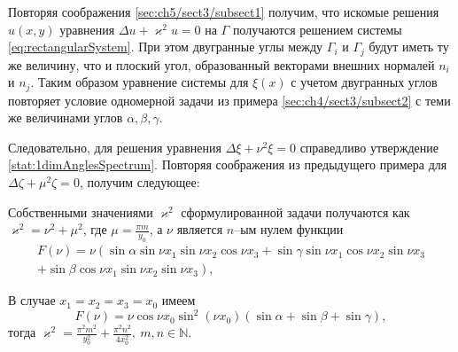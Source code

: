 Повторяя соображения \eqref{sec:ch5/sect3/subsect1} получим, что искомые решения $u(x,y)$ уравнения $\Delta u + \varkappa^2 u=0$ на $\Gamma$ получаются решением системы \eqref{eq:rectangularSystem}. При этом двугранные углы между $\Gamma_i$ и $\Gamma_j$ будут иметь ту же величину, что и плоский угол, образованный векторами внешних нормалей $n_i$ и $n_j$. Таким образом 
 уравнение системы для $\xi(x)$ с учетом двугранных углов повторяет условие одномерной задачи из примера \eqref{sec:ch4/sect3/subsect2} с теми же величинами углов $\alpha, \beta, \gamma$. 
 
Следовательно, для решения уравнения $\Delta \xi + \nu^2 \xi = 0$ справедливо утверждение \ref{stat:1dimAnglesSpectrum}.
Повторяя соображения из предыдущего примера для $\Delta \zeta + \mu^2 \zeta = 0$, получим следующее:
\begin{statement}
Собственными значениями $\varkappa^2$ сформулированной задачи получаются как
$\varkappa^2 = \nu^2 + \mu^2$, где $\mu =  \frac{\pi m}{y_0}$, а $\nu$ является $n$--ым нулем функции
\begin{multline*}
F(\nu)=\nu \left(
\sin{\alpha} \sin{\nu x_1} \sin{\nu x_2} \cos{\nu x_3} + 
\sin{\gamma} \sin{\nu x_1} \cos{\nu x_2} \sin{\nu x_3} 
\right. \\ \left. + 
\sin{\beta} \cos{\nu x_1} \sin{\nu x_2} \sin{\nu x_3} 
 \right),
 \end{multline*}
\end{statement}

В случае $x_1=x_2=x_3=x_0$ имеем $$F(\nu) = \nu \cos \nu x_0 \sin^2(\nu x_0) \left(\sin \alpha + \sin \beta + \sin \gamma \right),$$ тогда $\varkappa^2 = \frac{\pi^2 m^2}{y_0^2} + \frac{\pi^2 n^2}{4x_0^2}, \ m,n \in \mathbb{N}$.

\clearpage
